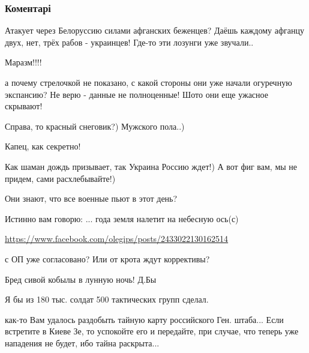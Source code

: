  
 
 
 
 
\subsubsection{Коментарі}
\label{sec:22_11_2021.fb.mishin_andrej.kiev.1.ugroza_23_feb_2022.cmt}

\begin{itemize} %

Атакует через Белоруссию силами афганских беженцев? Даёшь каждому афганцу двух,
нет, трёх рабов - украинцев! Где-то эти лозунги уже звучали..

Маразм!!!!


а почему стрелочкой не показано, с какой стороны они уже начали огуречную
экспансию? Не верю - данные не полноценные! Шото они еще ужасное скрывают!


Справа, то красный снеговик?)
Мужского пола..)

Капец, как секретно!

Как шаман дождь призывает, так Украина Россию ждет!) А вот фиг вам, мы не придем, сами расхлебывайте!)

Они знают, что все военные пьют в этот день?

Истинно вам говорю: ... года земля налетит на небесную ось(с)

\url{https://www.facebook.com/olegips/posts/2433022130162514}

с ОП уже согласовано? Или от крота ждут коррективы?

Бред сивой кобылы в лунную ночь! Д.Бы

Я бы из 180 тыс. солдат 500 тактических групп сделал.


как-то Вам удалось раздобыть тайную карту российского Ген. штаба... Если
встретите в Киеве Зе, то успокойте его и передайте, при случае, что теперь уже
нападения не будет, ибо тайна раскрыта...


\end{itemize}
